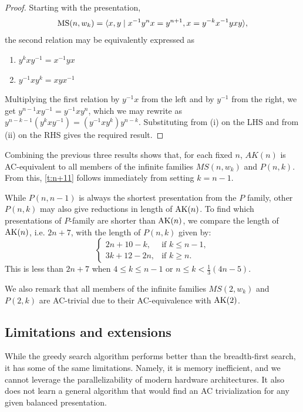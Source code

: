 \begin{proof}
    Starting with the presentation,
        \[
        \text{MS}(n, w_k) = \langle x, y \mid x^{-1} y^n x = y^{n+1}, x = y^{-k} x^{-1} y x y\rangle,
        \]
    the second relation may be equivalently expressed as 
    \begin{enumerate}[label=(\roman*)]
        \item $y^{k}xy^{-1}=x^{-1}yx$
        \item $y^{-1}xy^{k}=xyx^{-1}$
    \end{enumerate}
    Multiplying the first relation by $y^{-1} x$ from the left and by $y^{-1}$ from the right, we get $y^{n-1} x y^{-1} = y^{-1} x y^{n}$, which we may rewrite as $y^{n-k-1} \left(y^k x y^{-1}\right) = \left(y^{-1} x y^{k}\right) y^{n-k}$. Substituting from (i) on the LHS and from (ii) on the RHS gives the required result.
\end{proof}

Combining the previous three results shows that, for each fixed $n$, $AK(n)$ is AC-equivalent to all members of the infinite families $MS(n, w_k)$ and $P(n, k)$. From this, \cref{t:n+11} follows immediately from setting $k = n - 1$.

While $P(n, n-1)$ is always the shortest presentation from the $P$ family, other $P(n, k)$ may also give reductions in length of $\text{AK}(n)$. To find which presentations of $P$-family are shorter than $\text{AK}(n)$, we compare the length of $\text{AK}(n)$, i.e. $2n + 7$, with the length of $P(n, k)$ given by:
\[
    \begin{cases} 
        2n + 10 - k, & \text{if } k \leq n-1, \\
        3k + 12 - 2n, & \text{if } k \geq n.
    \end{cases}
\]
This is less than $2n+7$ when $4 \leq k \leq n-1$ or $n \leq k < \frac{1}{3} \left(4n-5 \right)$. 

We also remark that all members of the infinite families $MS(2, w_k)$ and $P(2, k)$ are AC-trivial due to their AC-equivalence with $\text{AK}(2)$.



\subsection{Limitations and extensions}

While the greedy search algorithm performs better than the breadth-first search, it has some of the same limitations.
Namely, it is memory inefficient, and we cannot leverage the parallelizability of modern hardware architectures.
It also does not learn a general algorithm that would find an AC trivialization for any given balanced presentation.

